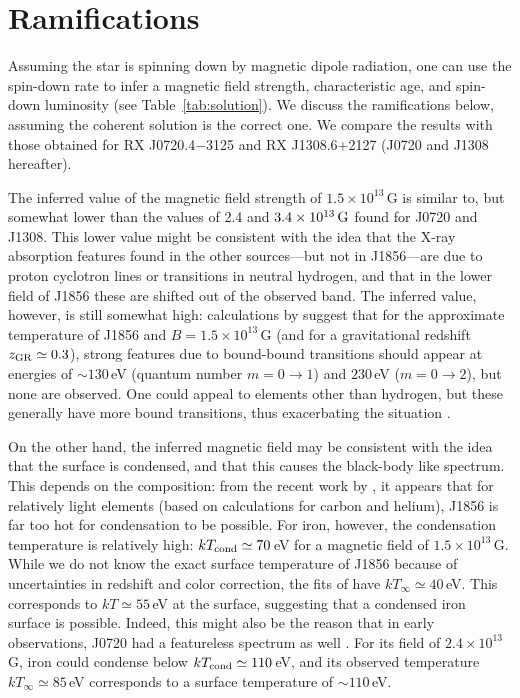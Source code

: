 \documentclass{emulateapj}\usepackage{apjfonts}
\newcommand{\expnt}[2]{\ensuremath{#1 \times 10^{#2}}}   %
\begin{document}
\section{Ramifications}\label{sec:discussion}
Assuming the star is spinning down by magnetic dipole radiation, one
can use the spin-down rate to infer a magnetic field strength,
characteristic age, and spin-down luminosity (see
Table~\ref{tab:solution}).  We discuss the ramifications below,
assuming the coherent solution is the correct one.  We compare the
results with those obtained for RX J0720.4$-$3125 and RX J1308.6+2127
(J0720 and J1308 hereafter).

The inferred value of the magnetic field strength of
$\expnt{1.5}{13}\,$G is similar to, but somewhat lower than the values
of 2.4 and $\expnt{3.4}{13}{\rm\,G}$ found for J0720 and J1308.
This lower value might be consistent with the idea that the X-ray
absorption features found in the other sources---but not in
J1856---are due to proton cyclotron lines or transitions in neutral
hydrogen, and that in the lower field of J1856 these are shifted out
of the observed band.  The inferred value, however, is still somewhat
high: calculations by \citet{hkc+07} suggest that for the approximate
temperature of J1856 and $B=\expnt{1.5}{13}\,$G (and for a
gravitational redshift $z_{\rm GR}\simeq0.3$), strong features due to
bound-bound transitions should appear at energies of $\sim\!130\,$eV
(quantum number $m=0\rightarrow1$) and $230\,$eV ($m=0\rightarrow2$),
but none are observed.  One could appeal to elements other than
hydrogen, but these generally have more bound transitions, thus
exacerbating the situation \citep[e.g.,][]{pwl+02,mh07}.


On the other hand, the inferred magnetic field may be consistent with
the idea that the surface is condensed, and that this causes the
black-body like spectrum.  This depends on the composition: from the
recent work by \citet{ml07b}, it appears that for relatively light
elements (based on calculations for carbon and helium), J1856 is far
too hot for condensation to be possible.  For iron, however, the
condensation temperature is relatively high: $kT_{\rm
  cond}\simeq70\,$eV for a magnetic field of $\expnt{1.5}{13}\,$G.
While we do not know the exact surface temperature of J1856 because of
uncertainties in redshift and color correction, the fits of
\citet{hkc+07} have $kT_{\infty}\simeq40\,$eV.  This corresponds to
$kT\simeq55\,$eV at the surface, suggesting that a condensed iron
surface is possible.  Indeed, this might also be the reason that in
early observations, J0720 had a featureless spectrum as well
\citep{pmm+01}.  For its field of $\expnt{2.4}{13}\,$G, iron could
condense below $kT_{\rm cond}\simeq110$\,eV, and its observed
temperature $kT_\infty\simeq85\,$eV corresponds to a surface temperature
of $\sim\!110\,$eV.
\end{document}
